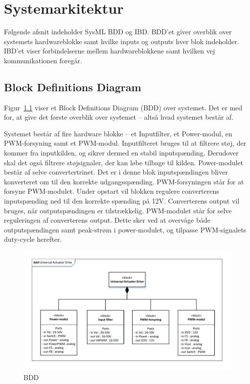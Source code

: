 \chapter{Systemarkitektur}

 
Følgende afsnit indeholder SysML BDD og IBD. BDD'et giver overblik over systemets hardwareblokke samt hvilke inputs og outputs hver blok indeholder. IBD'et viser forbindelserne mellem hardwareblokkene samt hvilken vej kommunikationen foregår.


\section{Block Definitions Diagram}
\noindent Figur~\ref{fig: BDD} viser et Block Definitions Diagram (BDD) over systemet. Det er med for, at give det første overblik over systemet -- altså hvad systemet består af.

Systemet består af fire hardware blokke -- et Inputfilter, et Power-modul, en PWM-forsyning samt et PWM-modul.
Inputfilteret bruges til at filtrere støj, der kommer fra inputkilden, og sikrer dermed en stabil inputspænding. Derudover skal det også filtrere støjsignaler, der kan løbe tilbage til kilden.
Power-modulet består af selve convertertrinet. Det er i denne blok inputspændingen bliver konverteret om til den korrekte udgangsspænding.
PWM-forsyningen står for at forsyne PWM-modulet. Under opstart vil blokken regulere converterens inputspænding ned til den korrekte spænding på 12V. Converterens output vil bruges, når outputspændingen er tilstrækkelig.
PWM-modulet står for selve reguleringen af converterens output. Dette sker ved at overvåge både outputspændingen samt peak-strøm i power-modulet, og tilpasse PWM-signalets duty-cycle herefter.   

\begin{figure}[H]
	\centering
	\includegraphics[width=1.00\textwidth]{tex/systemarkitektur/billeder/BDD.pdf}
	\caption{BDD}
	\label{fig: BDD}
\end{figure}

